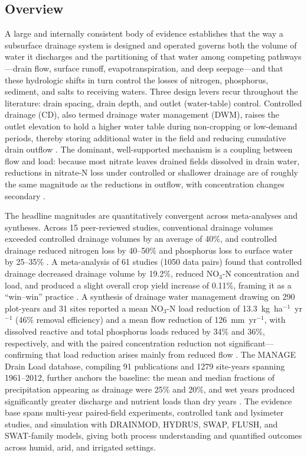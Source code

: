 \subsection{Overview}

A large and internally consistent body of evidence establishes that the way a
subsurface drainage system is designed and operated governs both the volume of
water it discharges and the partitioning of that water among competing
pathways---drain flow, surface runoff, evapotranspiration, and deep
seepage---and that these hydrologic shifts in turn control the losses of
nitrogen, phosphorus, sediment, and salts to receiving waters. Three design
levers recur throughout the literature: drain spacing, drain depth, and outlet
(water-table) control. Controlled drainage (CD), also termed drainage water
management (DWM), raises the outlet elevation to hold a higher water table
during non-cropping or low-demand periods, thereby storing additional water in
the field and reducing cumulative drain outflow \parencite{Singh2020,Strock2011,Blann2009}.
The dominant, well-supported mechanism is a coupling between flow and load:
because most nitrate leaves drained fields dissolved in drain water, reductions
in nitrate-N loss under controlled or shallower drainage are of roughly the same
magnitude as the reductions in outflow, with concentration changes secondary
\parencite{Wesström2007,Frankenberger2024,Lalonde1996,Tolomio2018}.

The headline magnitudes are quantitatively convergent across meta-analyses and
syntheses. Across 15 peer-reviewed studies, conventional drainage volumes
exceeded controlled drainage volumes by an average of 40\%, and controlled
drainage reduced nitrogen loss by 40--50\% and phosphorus loss to surface water
by 25--35\% \parencite{Strock2011}. A meta-analysis of 61 studies (1050 data
pairs) found that controlled drainage decreased drainage volume by 19.2\%,
reduced NO$_3$-N concentration and load, and produced a slight overall crop
yield increase of 0.11\%, framing it as a ``win--win'' practice
\parencite{Wang2020c}. A synthesis of drainage water management drawing on 290
plot-years and 31 sites reported a mean NO$_3$-N load reduction of
13.3~kg~ha$^{-1}$~yr$^{-1}$ (46\% removal efficiency) and a mean flow reduction
of 126~mm~yr$^{-1}$, with dissolved reactive and total phosphorus loads reduced
by 34\% and 36\%, respectively, and with the paired concentration reduction not
significant---confirming that load reduction arises mainly from reduced flow
\parencite{Frankenberger2024}. The MANAGE Drain Load database, compiling 91
publications and 1279 site-years spanning 1961--2012, further anchors the
baseline: the mean and median fractions of precipitation appearing as drainage
were 25\% and 20\%, and wet years produced significantly greater discharge and
nutrient loads than dry years \parencite{Christianson2015}. The evidence base
spans multi-year paired-field experiments, controlled tank and lysimeter
studies, and simulation with DRAINMOD, HYDRUS, SWAP, FLUSH, and SWAT-family
models, giving both process understanding and quantified outcomes across humid,
arid, and irrigated settings.

